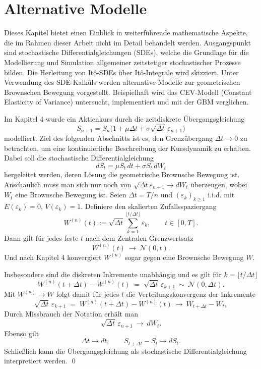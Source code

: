 \section{Alternative Modelle}

Dieses Kapitel bietet einen Einblick in weiterführende mathematische Aspekte, die im Rahmen 
dieser Arbeit nicht im Detail behandelt werden.
Ausgangspunkt sind stochastische Differentialgleichungen (SDEs), welche die Grundlage für die 
Modellierung und Simulation allgemeiner zeitstetiger 
stochastischer Prozesse bilden. Die Herleitung von Itô-SDEs über Itô-Integrale wird skizziert. 
Unter Verwendung des SDE-Kalküls werden alternative Modelle zur geometrischen Brownschen Bewegung vorgestellt. 
Beispielhaft wird das CEV-Modell (Constant Elasticity of Variance) untersucht, implementiert
und mit der GBM verglichen.

\begin{bem}

Im Kapitel 4 wurde ein Aktienkurs durch die zeitdiskrete Übergangsgleichung
$$S_{n+1} = S_n \big(1 + \mu \Delta t + \sigma \sqrt{\Delta t}\,\varepsilon_{n+1}\big)$$
modelliert. Ziel des folgenden Abschnitts ist es, den Grenzübergang $\Delta t \to 0$ zu betrachten,
um eine kontinuierliche Beschreibung der Kursdynamik zu erhalten. Dabei soll die stochastische Differentialgleichung
$$dS_t = \mu S_t\,dt + \sigma S_t\,dW_t$$
hergeleitet werden, deren Lösung die geometrische Brownsche Bewegung ist. 
Anschaulich muss man sich nur noch von $\sqrt{\Delta t} \varepsilon_{n+1} \to dW_t$ überzeugen, wobei $W_t$ eine Brownsche Bewegung ist.
Seien $\Delta t = T/n$ und $(\varepsilon_k)_{k\ge 1}$ i.i.d. mit $E(\varepsilon_k)=0$, $V(\varepsilon_k)=1$.
Definiere den skalierten Zufallsspaziergang
$$
W^{(n)}(t) := \sqrt{\Delta t}\sum_{k=1}^{\lfloor t/\Delta t\rfloor}\varepsilon_k,\qquad t\in[0,T].
$$
Dann gilt für jedes feste $t$ nach dem Zentralen Grenzwertsatz
$$
W^{(n)}(t)\ \to\ \mathcal N(0,t).
$$
Und nach Kapitel 4 konvergiert $W^{(n)}$ sogar gegen eine Brownsche Bewegung $W$.

Insbesondere sind die diskreten Inkremente unabhängig und es gilt für $k=\lfloor t/\Delta t\rfloor$
$$
W^{(n)}(t+\Delta t)-W^{(n)}(t)\;=\;\sqrt{\Delta t}\,\varepsilon_{k+1}\ \sim\ \mathcal N(0,\Delta t).
$$
Mit $W^{(n)}\to W$ folgt damit für jedes $t$ die Verteilungskonvergenz der Inkremente
$$
\sqrt{\Delta t}\,\varepsilon_{k+1}
\;=\;W^{(n)}(t+\Delta t)-W^{(n)}(t)\ \to \ W_{t+\Delta t}-W_t,
$$
Durch Missbrauch der Notation erhält man
$$
\sqrt{\Delta t}\,\varepsilon_{n+1}\ \to\ dW_t.
$$
Ebenso gilt
$$\Delta t \to dt, \qquad S_{t + \Delta t} - S_t \to dS_t.$$
Schließlich kann die Übergangsgleichung als stochastische Differentialgleichung interpretiert werden.
\qed

\end{bem}

